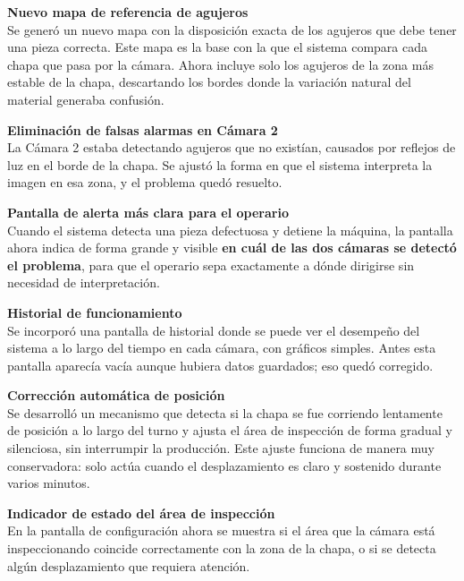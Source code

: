 \documentclass[11pt, a4paper]{article}
\begin{document}
\begin{abox}
\textbf{Nuevo mapa de referencia de agujeros}\\[4pt]
Se generó un nuevo mapa con la disposición exacta de los agujeros que debe tener
una pieza correcta. Este mapa es la base con la que el sistema compara cada chapa
que pasa por la cámara. Ahora incluye solo los agujeros de la zona más estable de
la chapa, descartando los bordes donde la variación natural del material generaba
confusión.
\end{abox}

\begin{abox}
\textbf{Eliminación de falsas alarmas en Cámara 2}\\[4pt]
La Cámara 2 estaba detectando agujeros que no existían, causados por reflejos de
luz en el borde de la chapa. Se ajustó la forma en que el sistema interpreta la
imagen en esa zona, y el problema quedó resuelto.
\end{abox}

\begin{abox}
\textbf{Pantalla de alerta más clara para el operario}\\[4pt]
Cuando el sistema detecta una pieza defectuosa y detiene la máquina, la pantalla
ahora indica de forma grande y visible \textbf{en cuál de las dos cámaras se
detectó el problema}, para que el operario sepa exactamente a dónde dirigirse sin
necesidad de interpretación.
\end{abox}

\begin{abox}
\textbf{Historial de funcionamiento}\\[4pt]
Se incorporó una pantalla de historial donde se puede ver el desempeño del sistema
a lo largo del tiempo en cada cámara, con gráficos simples. Antes esta pantalla
aparecía vacía aunque hubiera datos guardados; eso quedó corregido.
\end{abox}

\begin{abox}
\textbf{Corrección automática de posición}\\[4pt]
Se desarrolló un mecanismo que detecta si la chapa se fue corriendo lentamente de
posición a lo largo del turno y ajusta el área de inspección de forma gradual y
silenciosa, sin interrumpir la producción. Este ajuste funciona de manera muy
conservadora: solo actúa cuando el desplazamiento es claro y sostenido durante
varios minutos.
\end{abox}

\begin{abox}
\textbf{Indicador de estado del área de inspección}\\[4pt]
En la pantalla de configuración ahora se muestra si el área que la cámara está
inspeccionando coincide correctamente con la zona de la chapa, o si se detecta
algún desplazamiento que requiera atención.
\end{abox}
\end{document}
